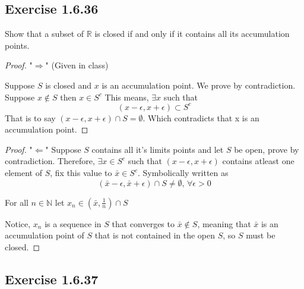 \documentclass{tufte-book}
\theoremstyle{mytheoremstyle}
\theoremstyle{mylemstyle}
\theoremstyle{mydefstyle}
\begin{document}
\subsection{Exercise 1.6.36}
Show that a subset of $\mathbb{R}$ is closed if and only if it contains all its accumulation points.

\begin{proof}"$\Rightarrow$" (Given in class)

Suppose $S$ is closed and $x$ is an accumulation point.  We prove by contradiction.  Suppose $x \notin S$ then $x \in S^c$  This means, $\exists x$ such that
\[(x - \epsilon, x+\epsilon) \subset S^c \]
That is to say $(x-\epsilon, x+\epsilon) \cap S = \emptyset$.  Which contradicts that x is an accumulation point.
\end{proof}

\begin{proof}"$\Leftarrow$"
Suppose $S$ contains all it's limits points and let $S$ be open, prove by contradiction.  Therefore, $\exists x \in S^c$ such that $(x- \epsilon, x+\epsilon)$ contains atleast one element of $S$, fix this value to $\bar{x} \in S^c$.  Symbolically written as
\[(\bar{x}- \epsilon, \bar{x}+\epsilon) \cap S \neq \emptyset \text{,  } \forall \epsilon > 0\]

For all $n \in \mathbb{N}$ let $x_n \in (\bar{x}, \frac{1}{n}) \cap S$ 

Notice, ${x_n}$ is a sequence in $S$ that converges to $\bar{x} \notin S$, meaning that $\bar{x}$ is an accumulation point of $S$ that is not contained in the open $S$, so $S$ must be closed.
\end{proof}

\subsection{Exercise 1.6.37}
\end{document}
